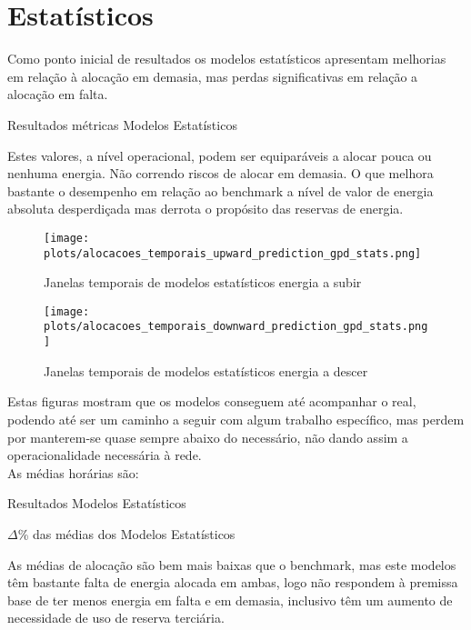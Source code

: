 \section{Estatísticos \label{se:resstats}}
Como ponto inicial de resultados os modelos estatísticos apresentam melhorias em relação à alocação em demasia, mas perdas significativas em relação a alocação em falta.\\

\begin{table}[H]
    \caption{Resultados métricas Modelos Estatísticos}    
    \resizebox{\linewidth}{!}{}
    \label{tab:statsmetrics}
    \end{table}

Estes valores, a nível operacional, podem ser equiparáveis a alocar pouca ou nenhuma energia. Não correndo riscos de alocar em demasia. O que melhora bastante o desempenho em relação ao benchmark a nível de valor de energia absoluta desperdiçada mas derrota o propósito das reservas de energia.\\

\begin{figure}[H]
    \centering
    \texttt{[image: plots/alocacoes\_temporais\_upward\_prediction\_gpd\_stats.png]}
    \caption{Janelas temporais de modelos estatísticos energia a subir}
    \label{fig:statstimewindowsup}
\end{figure}


\begin{figure}[H]
    \centering
    \texttt{[image: plots/alocacoes\_temporais\_downward\_prediction\_gpd\_stats.png]}
    \caption{Janelas temporais de modelos estatísticos energia a descer}
    \label{fig:statstimewindowsdown}
\end{figure}

Estas figuras mostram que os modelos conseguem até acompanhar o real, podendo até ser um caminho a seguir com algum trabalho específico, mas perdem por manterem-se quase sempre abaixo do necessário, não dando assim a operacionalidade necessária à rede.\\
As médias horárias são:\\
\begin{table}[H]
    \resizebox{\linewidth}{!}{}
    \caption{Resultados Modelos Estatísticos}
    \label{tab:statsres}
    \end{table}



\begin{table}[H]
    \resizebox{\linewidth}{!}{}
    \caption{$\Delta$\% das médias dos Modelos Estatísticos}    
    \label{tab:statsres_deltas}
    \end{table}

As médias de alocação são bem mais baixas que o benchmark, mas este modelos têm bastante falta de energia alocada em ambas, logo não respondem à premissa base de ter menos energia em falta e em demasia, inclusivo têm um aumento de necessidade de uso de reserva terciária.\\
